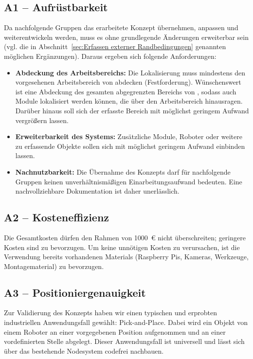 \subsection{A1 -- Aufrüstbarkeit}
Da nachfolgende Gruppen das erarbeitete Konzept übernehmen, anpassen und weiterentwickeln werden, muss es ohne grundlegende Änderungen erweiterbar sein (vgl. die in Abschnitt~\ref{sec:Erfassen externer Randbedingungen} genannten möglichen Ergänzungen). Daraus ergeben sich folgende Anforderungen:
\begin{itemize}
    \item \textbf{Abdeckung des Arbeitsbereichs:} Die Lokalisierung muss mindestens den vorgesehenen Arbeitsbereich von  abdecken (Festforderung). Wünschenswert ist eine Abdeckung des gesamten abgegrenzten Bereichs von , sodass auch Module lokalisiert werden können, die über den Arbeitsbereich hinausragen. Darüber hinaus soll sich der erfasste Bereich mit möglichst geringem Aufwand vergrößern lassen.
    \item \textbf{Erweiterbarkeit des Systems:} Zusätzliche Module, Roboter oder weitere zu erfassende Objekte sollen sich mit möglichst geringem Aufwand einbinden lassen.
    \item \textbf{Nachnutzbarkeit:} Die Übernahme des Konzepts darf für nachfolgende Gruppen keinen unverhältnismäßigen Einarbeitungsaufwand bedeuten. Eine nachvollziehbare Dokumentation ist daher unerlässlich.
\end{itemize}

\subsection{A2 -- Kosteneffizienz}
Die Gesamtkosten dürfen den Rahmen von \SI{1000}{\euro} nicht überschreiten; geringere Kosten sind zu bevorzugen. Um keine unnötigen Kosten zu verursachen, ist die Verwendung bereits vorhandenen Materials (Raspberry Pis, Kameras, Werkzeuge, Montagematerial) zu bevorzugen.

\subsection{A3 -- Positioniergenauigkeit}
Zur Validierung des Konzepts haben wir einen typischen und erprobten industriellen Anwendungsfall gewählt: Pick-and-Place. Dabei wird ein Objekt von einem Roboter an einer vorgegebenen Position aufgenommen und an einer vordefinierten Stelle abgelegt. Dieser Anwendungsfall ist universell und lässt sich über das bestehende Nodesystem codefrei nachbauen.



